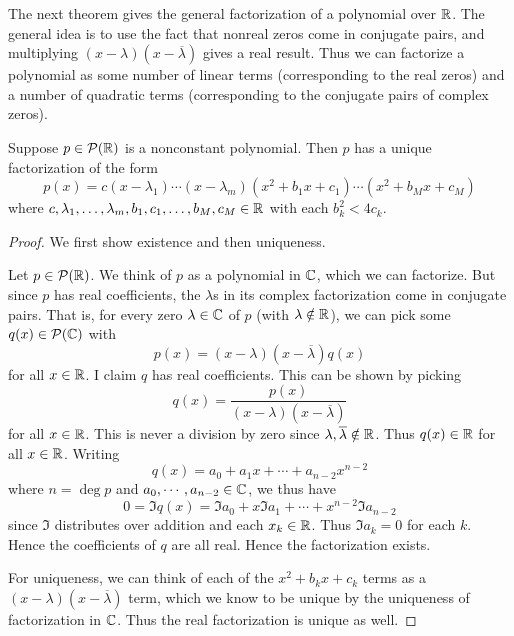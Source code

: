 The next theorem gives the general factorization of a polynomial over $\mathbb{R}$. The general idea is to use the fact that nonreal zeros come in conjugate pairs, and multiplying $(x-\lambda)(x-\overline \lambda)$ gives a real result. Thus we can factorize a polynomial as some number of linear terms (corresponding to the real zeros) and a number of quadratic terms (corresponding to the conjugate pairs of complex zeros).
\begin{theorem}
    Suppose $p\in\mathcal{P}(\mathbb{R})$ is a nonconstant polynomial. Then $p$ has a unique factorization of the form
    \[ p(x) = c(x-\lambda_1)\cdots(x-\lambda_m)(x^2+b_1x+c_1)\cdots(x^2+b_Mx+c_M)\]
    where $c,\lambda_1,\dots,\lambda_m,b_1,c_1,\dots,b_M,c_M\in\mathbb{R}$ with each $b_k^2 < 4c_k$.
\end{theorem}
\begin{proof}
    We first show existence and then uniqueness.

    Let $p\in\mathcal{P}(\mathbb{R})$. We think of $p$ as a polynomial in $\mathbb{C}$, which we can factorize. But since $p$ has real coefficients, the $\lambda$s in its complex factorization come in conjugate pairs. That is, for every zero $\lambda\in\mathbb{C}$ of $p$ (with $\lambda\notin \mathbb{R}$), we can pick some $q(x)\in\mathcal{P}(\mathbb{C})$ with
    \[ p(x) = (x-\lambda)(x-\overline \lambda)q(x)\]
    for all $x\in\mathbb{R}$. I claim $q$ has real coefficients. This can be shown by picking
    \[ q(x) = \frac{p(x)}{(x-\lambda)(x-\overline\lambda)} \]
    for all $x\in\mathbb{R}$. This is never a division by zero since $\lambda,\overline\lambda\notin\mathbb{R}$. Thus $q(x)\in\mathbb{R}$ for all $x\in\mathbb{R}$. Writing
    \[ q(x) = a_0 + a_1x + \cdots + a_{n-2}x^{n-2}\]
    where $n = \deg p$ and $a_0, \cdots, a_{n-2}\in\mathbb{C}$, we thus have
    \[ 0 = \Im q(x) = \Im a_0 + x\Im a_1 + \cdots + x^{n-2}\Im a_{n-2}\]
    since $\Im$ distributes over addition and each $x_k\in\mathbb{R}$. Thus $\Im a_k = 0$ for each $k$. Hence the coefficients of $q$ are all real. Hence the factorization exists.

    For uniqueness, we can think of each of the $x^2 + b_kx + c_k$ terms as a $(x-\lambda)(x-\overline \lambda)$ term, which we know to be unique by the uniqueness of factorization in $\mathbb{C}$. Thus the real factorization is unique as well.
\end{proof}